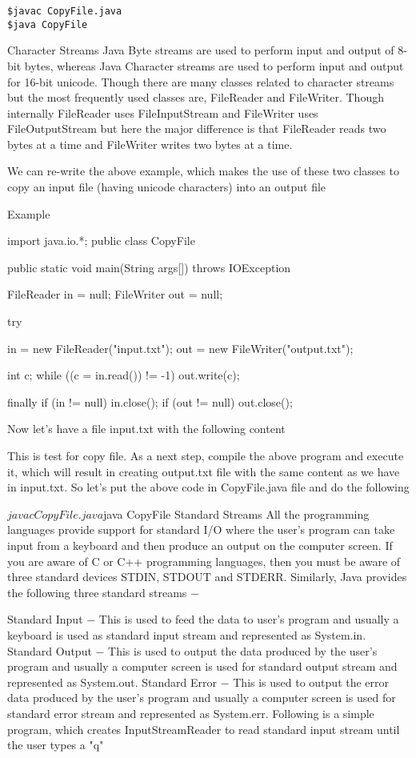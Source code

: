 \begin{lstlisting}
$javac CopyFile.java
$java CopyFile
\end{lstlisting}

Character Streams
Java Byte streams are used to perform input and output of 8-bit bytes, whereas Java Character streams are used to perform input and output for 16-bit unicode. Though there are many classes related to character streams but the most frequently used classes are, FileReader and FileWriter. Though internally FileReader uses FileInputStream and FileWriter uses FileOutputStream but here the major difference is that FileReader reads two bytes at a time and FileWriter writes two bytes at a time.

We can re-write the above example, which makes the use of these two classes to copy an input file (having unicode characters) into an output file

Example

import java.io.*;
public class CopyFile {

   public static void main(String args[]) throws IOException {
      FileReader in = null;
      FileWriter out = null;

      try {
         in = new FileReader("input.txt");
         out = new FileWriter("output.txt");

         int c;
         while ((c = in.read()) != -1) {
            out.write(c);
         }
      }finally {
         if (in != null) {
            in.close();
         }
         if (out != null) {
            out.close();
         }
      }
   }
}
Now let's have a file input.txt with the following content

This is test for copy file.
As a next step, compile the above program and execute it, which will result in creating output.txt file with the same content as we have in input.txt. So let's put the above code in CopyFile.java file and do the following

$javac CopyFile.java
$java CopyFile
Standard Streams
All the programming languages provide support for standard I/O where the user's program can take input from a keyboard and then produce an output on the computer screen. If you are aware of C or C++ programming languages, then you must be aware of three standard devices STDIN, STDOUT and STDERR. Similarly, Java provides the following three standard streams −

Standard Input − This is used to feed the data to user's program and usually a keyboard is used as standard input stream and represented as System.in.
Standard Output − This is used to output the data produced by the user's program and usually a computer screen is used for standard output stream and represented as System.out.
Standard Error − This is used to output the error data produced by the user's program and usually a computer screen is used for standard error stream and represented as System.err.
Following is a simple program, which creates InputStreamReader to read standard input stream until the user types a "q"

